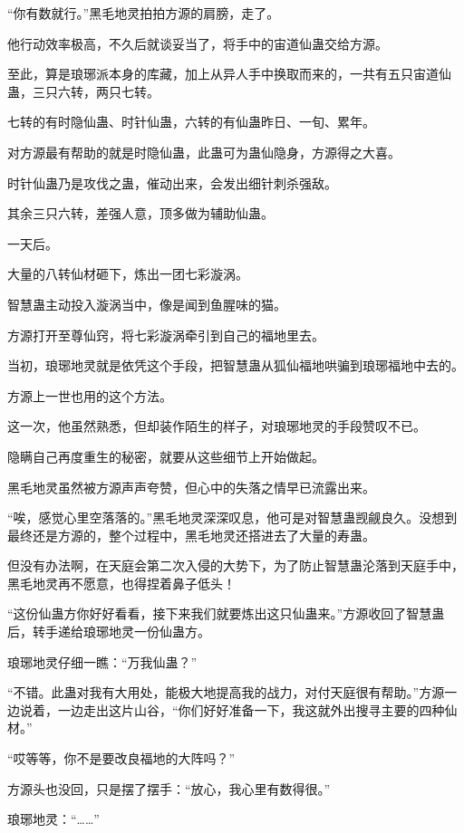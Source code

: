 \begin{this_body}
“你有数就行。”黑毛地灵拍拍方源的肩膀，走了。

他行动效率极高，不久后就谈妥当了，将手中的宙道仙蛊交给方源。

至此，算是琅琊派本身的库藏，加上从异人手中换取而来的，一共有五只宙道仙蛊，三只六转，两只七转。

七转的有时隐仙蛊、时针仙蛊，六转的有仙蛊昨日、一旬、累年。

对方源最有帮助的就是时隐仙蛊，此蛊可为蛊仙隐身，方源得之大喜。

时针仙蛊乃是攻伐之蛊，催动出来，会发出细针刺杀强敌。

其余三只六转，差强人意，顶多做为辅助仙蛊。

一天后。

大量的八转仙材砸下，炼出一团七彩漩涡。

智慧蛊主动投入漩涡当中，像是闻到鱼腥味的猫。

方源打开至尊仙窍，将七彩漩涡牵引到自己的福地里去。

当初，琅琊地灵就是依凭这个手段，把智慧蛊从狐仙福地哄骗到琅琊福地中去的。

方源上一世也用的这个方法。

这一次，他虽然熟悉，但却装作陌生的样子，对琅琊地灵的手段赞叹不已。

隐瞒自己再度重生的秘密，就要从这些细节上开始做起。

黑毛地灵虽然被方源声声夸赞，但心中的失落之情早已流露出来。

“唉，感觉心里空落落的。”黑毛地灵深深叹息，他可是对智慧蛊觊觎良久。没想到最终还是方源的，整个过程中，黑毛地灵还搭进去了大量的寿蛊。

但没有办法啊，在天庭会第二次入侵的大势下，为了防止智慧蛊沦落到天庭手中，黑毛地灵再不愿意，也得捏着鼻子低头！

“这份仙蛊方你好好看看，接下来我们就要炼出这只仙蛊来。”方源收回了智慧蛊后，转手递给琅琊地灵一份仙蛊方。

琅琊地灵仔细一瞧：“万我仙蛊？”

“不错。此蛊对我有大用处，能极大地提高我的战力，对付天庭很有帮助。”方源一边说着，一边走出这片山谷，“你们好好准备一下，我这就外出搜寻主要的四种仙材。”

“哎等等，你不是要改良福地的大阵吗？”

方源头也没回，只是摆了摆手：“放心，我心里有数得很。”

琅琊地灵：“……”

\end{this_body}

